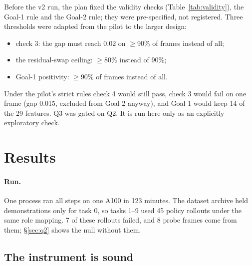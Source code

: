 \documentclass{article} %
\begin{document}
Before the v2 run, the plan fixed the validity checks (Table~\ref{tab:validity}), the Goal-1 rule and the Goal-2 rule; they were pre-specified, not registered. Three thresholds were adapted from the pilot to the larger design:
\begin{itemize}[leftmargin=*,itemsep=0pt,topsep=1pt]
  \item check 3: the gap must reach 0.02 on $\ge$90\% of frames instead of all;
  \item the residual-swap ceiling: $\ge$80\% instead of 90\%;
  \item Goal-1 positivity: $\ge$90\% of frames instead of all.
\end{itemize}
Under the pilot's strict rules check 4 would still pass, check 3 would fail on one frame (gap 0.015, excluded from Goal 2 anyway), and Goal 1 would keep 14 of the 29 features. Q3 was gated on Q2. It is run here only as an explicitly exploratory check.

\section{Results}
\label{sec:results}

\paragraph{Run.} One process ran all steps on one A100 in 123 minutes. The dataset archive held demonstrations only for task 0, so tasks 1--9 used 45 policy rollouts under the same role mapping. 7 of these rollouts failed, and 8 probe frames come from them; \S\ref{sec:q2} shows the null without them.

\subsection{The instrument is sound}
\label{sec:validity}

\begin{table}[t]
\caption{\textbf{Validity battery} (60 probe frames; checks 2 and 4 on 8 frames spread over tasks). All checks pass.}
\label{tab:validity}
\centering\small
{}
\end{table}
\end{document}
